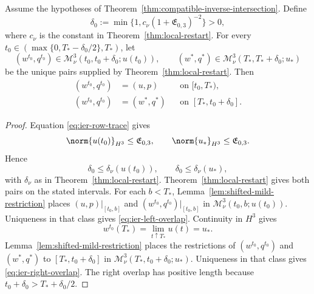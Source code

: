 \begin{lemma}
\label{lem:ier-late-slice-overlap}
Assume the hypotheses of
Theorem~\ref{thm:compatible-inverse-intersection}.
Define
\begin{equation}
 \delta_0
 :=\min\{1,c_\nu(1+\mathfrak E_{0,3})^{-2}\}>0,
 \label{eq:ier-uniform-restart-time}
\end{equation}
where \(c_\nu\) is the constant in Theorem~\ref{thm:local-restart}.
For every
\(t_0\in(\max\{0,T_*-\delta_0/2\},T_*)\), let
\[
 (w^{t_0},q^{t_0})
 \in\mathscr M_\nu^3(t_0,t_0+\delta_0;u(t_0)),
 \qquad
 (w^*,q^*)
 \in\mathscr M_\nu^3(T_*,T_*+\delta_0;u_*)
\]
be the unique pairs supplied by Theorem~\ref{thm:local-restart}.  Then
\begin{align}
 (w^{t_0},q^{t_0})&=(u,p)
 &&\text{on }[t_0,T_*),
 \label{eq:ier-left-overlap}\\
 (w^{t_0},q^{t_0})&=(w^*,q^*)
 &&\text{on }[T_*,t_0+\delta_0].
 \label{eq:ier-right-overlap}
\end{align}
\end{lemma}

\begin{proof}
Equation \eqref{eq:ier-row-trace} gives
\[
 \norm{u(t_0)}_{H^3}\le\mathfrak E_{0,3},
 \qquad
 \norm{u_*}_{H^3}\le\mathfrak E_{0,3}.
\]
Hence
\[
 \delta_0\le\delta_\nu(u(t_0)),
 \qquad
 \delta_0\le\delta_\nu(u_*),
\]
with \(\delta_\nu\) as in Theorem~\ref{thm:local-restart}.
Theorem~\ref{thm:local-restart} gives both pairs on the stated intervals.
For each \(b<T_*\), Lemma~\ref{lem:shifted-mild-restriction} places
\((u,p)|_{[t_0,b]}\) and
\((w^{t_0},q^{t_0})|_{[t_0,b]}\) in
\(\mathscr M_\nu^3(t_0,b;u(t_0))\).  Uniqueness in that class gives
\eqref{eq:ier-left-overlap}.  Continuity in \(H^3\) gives
\[
 w^{t_0}(T_*)=\lim_{t\uparrow T_*}u(t)=u_*.
\]
Lemma~\ref{lem:shifted-mild-restriction} places the restrictions of
\((w^{t_0},q^{t_0})\) and \((w^*,q^*)\) to
\([T_*,t_0+\delta_0]\) in
\(\mathscr M_\nu^3(T_*,t_0+\delta_0;u_*)\).  Uniqueness in that class gives
\eqref{eq:ier-right-overlap}.  The right overlap has positive length because
\(t_0+\delta_0>T_*+\delta_0/2\).
\end{proof}

